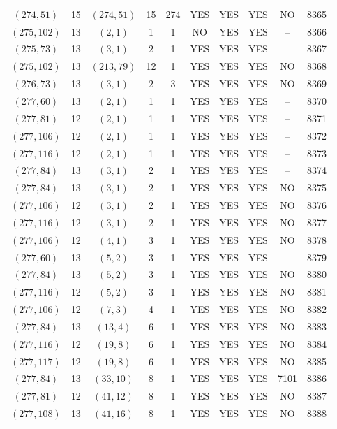 \begin{longtable}{|c|c|c|c|c|c|c|c|c|c|}
$(274, 51)$ & 15 & $(274, 51)$ & 15 & 274 & YES & YES & YES & NO & 8365\\
$(275, 102)$ & 13 & $(2, 1)$ & 1 & 1 & NO & YES & YES & -- & 8366\\
$(275, 73)$ & 13 & $(3, 1)$ & 2 & 1 & YES & YES & YES & -- & 8367\\
$(275, 102)$ & 13 & $(213, 79)$ & 12 & 1 & YES & YES & YES & NO & 8368\\
$(276, 73)$ & 13 & $(3, 1)$ & 2 & 3 & YES & YES & YES & NO & 8369\\
$(277, 60)$ & 13 & $(2, 1)$ & 1 & 1 & YES & YES & YES & -- & 8370\\
$(277, 81)$ & 12 & $(2, 1)$ & 1 & 1 & YES & YES & YES & -- & 8371\\
$(277, 106)$ & 12 & $(2, 1)$ & 1 & 1 & YES & YES & YES & -- & 8372\\
$(277, 116)$ & 12 & $(2, 1)$ & 1 & 1 & YES & YES & YES & -- & 8373\\
$(277, 84)$ & 13 & $(3, 1)$ & 2 & 1 & YES & YES & YES & -- & 8374\\
$(277, 84)$ & 13 & $(3, 1)$ & 2 & 1 & YES & YES & YES & NO & 8375\\
$(277, 106)$ & 12 & $(3, 1)$ & 2 & 1 & YES & YES & YES & NO & 8376\\
$(277, 116)$ & 12 & $(3, 1)$ & 2 & 1 & YES & YES & YES & NO & 8377\\
$(277, 106)$ & 12 & $(4, 1)$ & 3 & 1 & YES & YES & YES & NO & 8378\\
$(277, 60)$ & 13 & $(5, 2)$ & 3 & 1 & YES & YES & YES & -- & 8379\\
$(277, 84)$ & 13 & $(5, 2)$ & 3 & 1 & YES & YES & YES & NO & 8380\\
$(277, 116)$ & 12 & $(5, 2)$ & 3 & 1 & YES & YES & YES & NO & 8381\\
$(277, 106)$ & 12 & $(7, 3)$ & 4 & 1 & YES & YES & YES & NO & 8382\\
$(277, 84)$ & 13 & $(13, 4)$ & 6 & 1 & YES & YES & YES & NO & 8383\\
$(277, 116)$ & 12 & $(19, 8)$ & 6 & 1 & YES & YES & YES & NO & 8384\\
$(277, 117)$ & 12 & $(19, 8)$ & 6 & 1 & YES & YES & YES & NO & 8385\\
$(277, 84)$ & 13 & $(33, 10)$ & 8 & 1 & YES & YES & YES & 7101 & 8386\\
$(277, 81)$ & 12 & $(41, 12)$ & 8 & 1 & YES & YES & YES & NO & 8387\\
$(277, 108)$ & 13 & $(41, 16)$ & 8 & 1 & YES & YES & YES & NO & 8388\\

\end{longtable}
